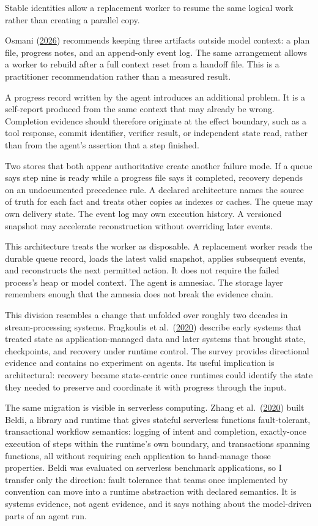 Stable identities allow a replacement worker to resume the same logical work rather than creating a parallel copy.

Osmani (\href{https://addyo.substack.com/p/long-running-agents}{2026}) recommends keeping three artifacts outside model context: a plan file, progress notes, and an append-only event log. The same arrangement allows a worker to rebuild after a full context reset from a handoff file. This is a practitioner recommendation rather than a measured result.

A progress record written by the agent introduces an additional problem. It is a self-report produced from the same context that may already be wrong. Completion evidence should therefore originate at the effect boundary, such as a tool response, commit identifier, verifier result, or independent state read, rather than from the agent's assertion that a step finished.

Two stores that both appear authoritative create another failure mode. If a queue says step nine is ready while a progress file says it completed, recovery depends on an undocumented precedence rule. A declared architecture names the source of truth for each fact and treats other copies as indexes or caches. The queue may own delivery state. The event log may own execution history. A versioned snapshot may accelerate reconstruction without overriding later events.

This architecture treats the worker as disposable. A replacement worker reads the durable queue record, loads the latest valid snapshot, applies subsequent events, and reconstructs the next permitted action. It does not require the failed process's heap or model context. The agent is amnesiac. The storage layer remembers enough that the amnesia does not break the evidence chain.

This division resembles a change that unfolded over roughly two decades in stream-processing systems. Fragkoulis et al.~(\href{https://arxiv.org/abs/2008.00842}{2020}) describe early systems that treated state as application-managed data and later systems that brought state, checkpoints, and recovery under runtime control. The survey provides directional evidence and contains no experiment on agents. Its useful implication is architectural: recovery became state-centric once runtimes could identify the state they needed to preserve and coordinate it with progress through the input.

The same migration is visible in serverless computing. Zhang et al.~(\href{https://www.usenix.org/conference/osdi20/presentation/zhang-haoran}{2020}) built Beldi, a library and runtime that gives stateful serverless functions fault-tolerant, transactional workflow semantics: logging of intent and completion, exactly-once execution of steps within the runtime's own boundary, and transactions spanning functions, all without requiring each application to hand-manage those properties. Beldi was evaluated on serverless benchmark applications, so I transfer only the direction: fault tolerance that teams once implemented by convention can move into a runtime abstraction with declared semantics. It is systems evidence, not agent evidence, and it says nothing about the model-driven parts of an agent run.

